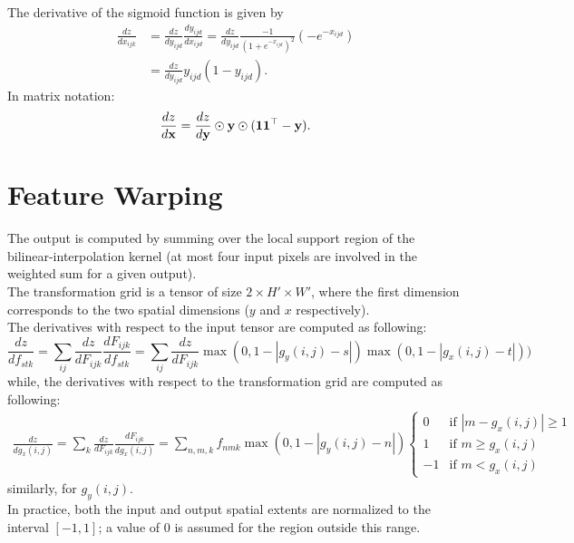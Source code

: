 The derivative of the sigmoid function is given by
\begin{align*}
\frac{dz}{dx_{ijk}}
&= 
\frac{dz}{d y_{ijd}} 
\frac{d y_{ijd}}{d x_{ijd}}
=
\frac{dz}{d y_{ijd}} 
\frac{-1}{(1+e^{-x_{ijd}})^2} ( - e^{-x_{ijd}})
\\
&=
\frac{dz}{d y_{ijd}} 
y_{ijd} (1 - y_{ijd}).
\end{align*}
In matrix notation:
\[
\frac{dz}{d\mathbf{x}} = \frac{dz}{d\mathbf{y}} \odot 
\mathbf{y} \odot 
(\mathbf{1}\mathbf{1}^\top - \mathbf{y}).
\]


\section{Feature Warping}\label{s:impl-sampler}
The output is computed by summing over the local support region of the bilinear-interpolation
kernel (at most four input pixels are involved in the weighted sum for a given output).\\

The transformation grid is a tensor of size $2{\times}H'{\times}W'$, where the first dimension corresponds to
the two spatial dimensions ($y$ and $x$ respectively).\\

The derivatives with respect to the input tensor are computed as following:
\[
  \frac{d z}{d f_{stk}} = \sum_{ij}\frac{dz}{d F_{ijk}}\frac{d F_{ijk}}{d f_{stk} } = \sum_{ij} \frac{dz}{d F_{ijk}} \max\left(0, 1-|g_y(i,j)-s|\right) \max\left(0, 1-|g_x(i,j)-t|\right)) 
\]
while, the derivatives with respect to the transformation grid are computed as following:
\begin{align*}
  \frac{d z}{d g_x(i,j)} = \sum_{k}\frac{d z}{d F_{ijk}}\frac{d F_{ijk}}{d g_x(i,j)} = \sum_{n,m,k}  f_{nmk} \max\left(0, 1-|g_y(i,j)-n|\right)
  \left\{
  \begin{array}{ll}
    0  & \mbox{if } |m-g_x(i,j)| \geq 1 \\
    1 & \mbox{if } m  \geq  g_x(i,j) \\
    -1 & \mbox{if } m < g_x(i,j)
  \end{array}
\right.
\end{align*}
similarly, for $g_y(i,j)$.\\

In practice, both the input and output spatial extents are normalized to the interval $[-1,1]$; 
a value of 0 is assumed for the region outside this range.\\
